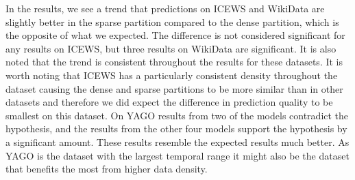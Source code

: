 In the results, we see a trend that predictions on ICEWS and WikiData are slightly better in the sparse partition compared to the dense partition, which is the opposite of what we expected.
The difference is not considered significant for any results on ICEWS, but three results on WikiData are significant. It is also noted that the trend is consistent throughout the results for these datasets.
It is worth noting that ICEWS has a particularly consistent density throughout the dataset causing the dense and sparse partitions to be more similar than in other datasets and therefore we did expect the difference in prediction quality to be smallest on this dataset.
On YAGO results from two of the models contradict the hypothesis, and the results from the other four models support the hypothesis by a significant amount. These results resemble the expected results much better. As YAGO is the dataset with the largest temporal range it might also be the dataset that benefits the most from higher data density.
